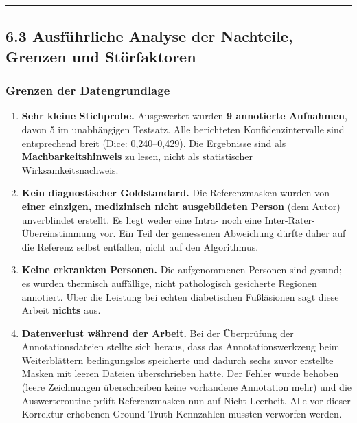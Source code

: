 \documentclass[
  11pt,
]{article}
\providecommand{\tightlist}{%
  \setlength{\itemsep}{0pt}\setlength{\parskip}{0pt}}
\begin{document}
\begin{center}\rule{0.5\linewidth}{0.5pt}\end{center}

\subsection{6.3 Ausführliche Analyse der Nachteile, Grenzen und
Störfaktoren}\label{ausfuxfchrliche-analyse-der-nachteile-grenzen-und-stuxf6rfaktoren}

\subsubsection{Grenzen der
Datengrundlage}\label{grenzen-der-datengrundlage}

\begin{enumerate}
\def\labelenumi{\arabic{enumi}.}
\tightlist
\item
  \textbf{Sehr kleine Stichprobe.} Ausgewertet wurden \textbf{9
  annotierte Aufnahmen}, davon 5 im unabhängigen Testsatz. Alle
  berichteten Konfidenzintervalle sind entsprechend breit (Dice:
  0,240--0,429). Die Ergebnisse sind als \textbf{Machbarkeitshinweis} zu
  lesen, nicht als statistischer Wirksamkeitsnachweis.
\item
  \textbf{Kein diagnostischer Goldstandard.} Die Referenzmasken wurden
  von \textbf{einer einzigen, medizinisch nicht ausgebildeten Person}
  (dem Autor) unverblindet erstellt. Es liegt weder eine Intra- noch
  eine Inter-Rater-Übereinstimmung vor. Ein Teil der gemessenen
  Abweichung dürfte daher auf die Referenz selbst entfallen, nicht auf
  den Algorithmus.
\item
  \textbf{Keine erkrankten Personen.} Die aufgenommenen Personen sind
  gesund; es wurden thermisch auffällige, nicht pathologisch gesicherte
  Regionen annotiert. Über die Leistung bei echten diabetischen
  Fußläsionen sagt diese Arbeit \textbf{nichts} aus.
\item
  \textbf{Datenverlust während der Arbeit.} Bei der Überprüfung der
  Annotationsdateien stellte sich heraus, dass das Annotationswerkzeug
  beim Weiterblättern bedingungslos speicherte und dadurch sechs zuvor
  erstellte Masken mit leeren Dateien überschrieben hatte. Der Fehler
  wurde behoben (leere Zeichnungen überschreiben keine vorhandene
  Annotation mehr) und die Auswerteroutine prüft Referenzmasken nun auf
  Nicht-Leerheit. Alle vor dieser Korrektur erhobenen
  Ground-Truth-Kennzahlen mussten verworfen werden.
\end{enumerate}
\end{document}
